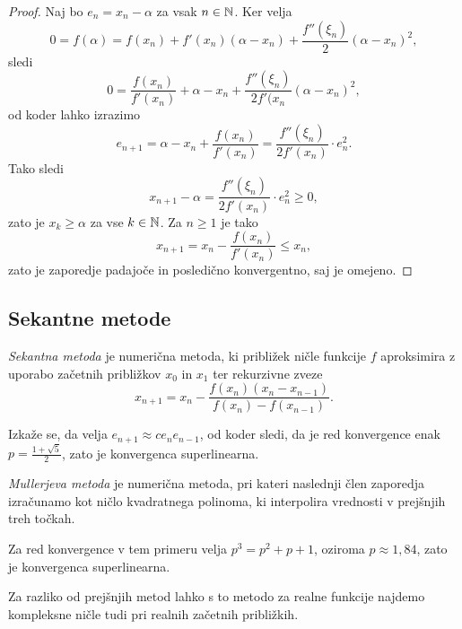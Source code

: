 \begin{proof}
Naj bo $e_n = x_n - \alpha$ za vsak $n \in \mathbb{N}$. Ker velja
\[
0 = f(\alpha) = f(x_n) + f'(x_n) (\alpha - x_n) +
\frac{f''(\xi_n)}{2} (\alpha - x_n)^2,
\]
sledi
\[
0 = \frac{f(x_n)}{f'(x_n)} + \alpha - x_n +
\frac{f''(\xi_n)}{2f'(x_n} (\alpha - x_n)^2,
\]
od koder lahko izrazimo
\[
e_{n+1} =
\alpha - x_n + \frac{f(x_n)}{f'(x_n)} =
\frac{f''(\xi_n)}{2 f'(x_n)} \cdot e_n^2.
\]
Tako sledi
\[
x_{n+1} - \alpha = \frac{f''(\xi_n)}{2 f'(x_n)} \cdot e_n^2 \geq 0,
\]
zato je $x_k \geq \alpha$ za vse $k \in \mathbb{N}$. Za $n \geq 1$ je tako
\[
x_{n+1} = x_n - \frac{f(x_n)}{f'(x_n)} \leq x_n,
\]
zato je zaporedje padajoče in posledično konvergentno, saj je
omejeno.
\end{proof}

\newpage

\subsection{Sekantne metode}

\begin{definicija}
\emph{Sekantna metoda} je
numerična metoda, ki približek ničle funkcije $f$ aproksimira z
uporabo začetnih približkov $x_0$ in $x_1$ ter rekurzivne zveze
\[
x_{n+1} = x_n - \frac{f(x_n) (x_n - x_{n-1})}{f(x_n) - f(x_{n-1})}.
\]
\end{definicija}

\begin{opomba}
Izkaže se, da velja $e_{n+1} \approx c e_n e_{n-1}$, od koder
sledi, da je red konvergence enak $p = \frac{1 + \sqrt{5}}{2}$,
zato je konvergenca superlinearna.
\end{opomba}

\begin{definicija}
\emph{Mullerjeva metoda} je
numerična metoda, pri kateri naslednji člen zaporedja izračunamo
kot ničlo kvadratnega polinoma, ki interpolira vrednosti v
prejšnjih treh točkah.
\end{definicija}

\begin{opomba}
Za red konvergence v tem primeru velja $p^3 = p^2 + p + 1$, oziroma
$p \approx 1{,}84$, zato je konvergenca superlinearna.
\end{opomba}

\begin{opomba}
Za razliko od prejšnjih metod lahko s to metodo za realne funkcije
najdemo kompleksne ničle tudi pri realnih začetnih približkih.
\end{opomba}

